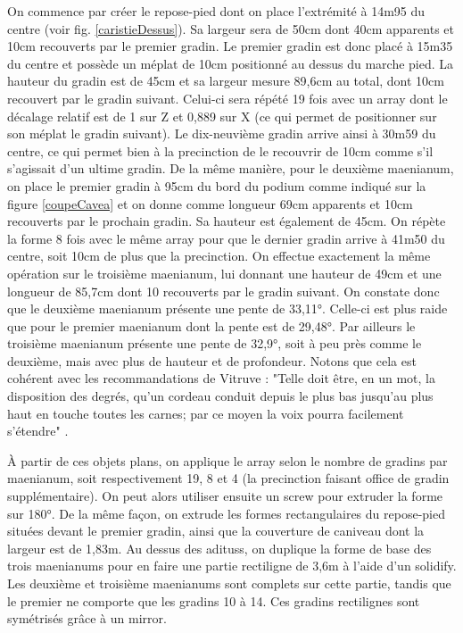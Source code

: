 On commence par créer le repose-pied dont on place l'extrémité à 14m95 du centre (voir fig. \ref{caristieDessus}). Sa largeur sera de 50cm dont 40cm apparents et 10cm recouverts par le premier gradin. Le premier gradin est donc placé à 15m35 du centre et possède un méplat de 10cm positionné au dessus du marche pied. La hauteur du gradin est de 45cm et sa largeur mesure 89,6cm au total, dont 10cm recouvert par le gradin suivant. Celui-ci sera répété 19 fois avec un \gls{array} dont le décalage relatif est de 1 sur Z et 0,889 sur X (ce qui permet de positionner sur son méplat le gradin suivant). Le dix-neuvième gradin arrive ainsi à 30m59 du centre, ce qui permet bien à la \gls{precinction} de le recouvrir de 10cm comme s'il s'agissait d'un ultime gradin. De la même manière, pour le deuxième \gls{maenianum}, on place le premier gradin à 95cm du bord du \gls{podium} comme indiqué sur la figure \ref{coupeCavea} et on donne comme longueur 69cm apparents et 10cm recouverts par le prochain gradin. Sa hauteur est également de 45cm. On répète la forme 8 fois avec le même \gls{array} pour que le dernier gradin arrive à 41m50 du centre, soit 10cm de plus que la  \gls{precinction}. On effectue exactement la même opération sur le troisième \gls{maenianum}, lui donnant une hauteur de 49cm et une longueur de 85,7cm dont 10 recouverts par le gradin suivant. On constate donc que le deuxième \gls{maenianum} présente une pente de 33,11°. Celle-ci est plus raide que pour le premier \gls{maenianum} dont la pente est de 29,48°. Par ailleurs le troisième \gls{maenianum} présente une pente de 32,9°, soit à peu près comme le deuxième, mais avec plus de hauteur et de profondeur. Notons que cela est cohérent avec les recommandations de Vitruve : "Telle doit être, en un mot, la disposition des degrés, qu'un cordeau conduit depuis le plus bas jusqu'au plus haut en touche toutes les carnes; par ce moyen la voix pourra facilement s'étendre" \cite[p.5]{vitruve}.

À partir de ces objets plans, on applique le \gls{array} selon le nombre de gradins par \gls{maenianum}, soit respectivement 19, 8 et 4 (la \gls{precinction} faisant office de gradin supplémentaire). On peut alors utiliser ensuite un \gls{screw} pour extruder la forme sur 180°. De la même façon, on extrude les formes rectangulaires du repose-pied situées devant le premier gradin, ainsi que la couverture de caniveau dont la largeur est de 1,83m. Au dessus des \glspl{aditus}, on duplique la forme de base des trois \glspl{maenianum} pour en faire une partie rectiligne de 3,6m à l'aide d'un \gls{solidify}. Les deuxième et troisième \glspl{maenianum} sont complets sur cette partie, tandis que le premier ne comporte que les gradins 10 à 14. Ces gradins rectilignes sont symétrisés grâce à un \gls{mirror}.

